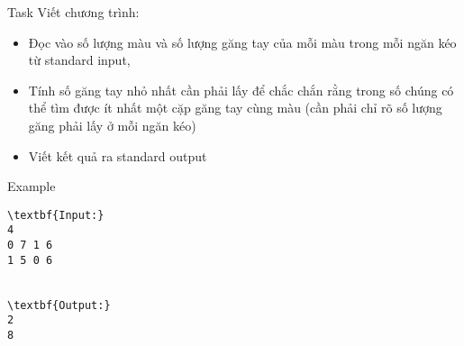 Task
Viết chương trình:  
\begin{itemize}
	\item     Đọc vào số lượng màu và số lượng găng tay của mỗi màu trong mỗi ngăn kéo từ standard input,   
	\item     Tính số găng tay nhỏ nhất cần phải lấy để chắc chắn rằng trong số chúng có thể tìm được ít nhất một cặp găng tay cùng màu (cần phải chỉ rõ số lượng găng phải lấy ở mỗi ngăn kéo)   
	\item     Viết kết quả ra standard output   
\end{itemize}
Example
\begin{verbatim}
\textbf{Input:}
4
0 7 1 6
1 5 0 6


\textbf{Output:}
2
8

\end{verbatim}